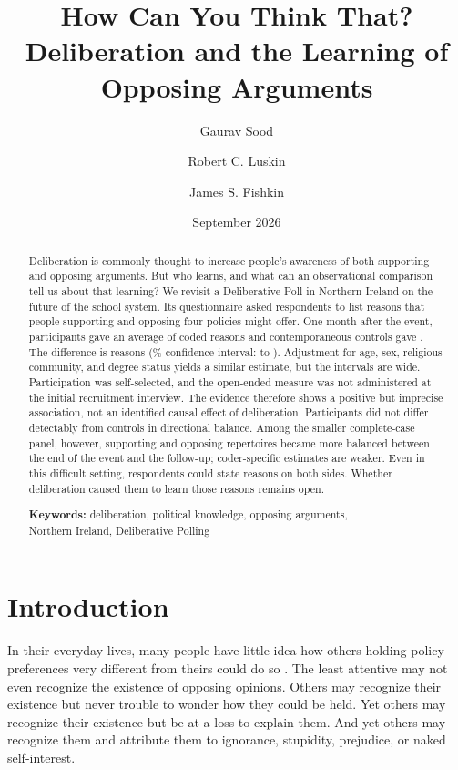 \documentclass{article}
\title{How Can You Think That?\\Deliberation and the Learning of Opposing Arguments}
\author{Gaurav Sood \and Robert C. Luskin \and James S. Fishkin}
\date{September 2026}
\begin{document}
\maketitle

\begin{abstract}
Deliberation is commonly thought to increase people's awareness of both supporting and
opposing arguments. But who learns, and what can an observational comparison tell us about
that learning? We revisit a Deliberative Poll in Northern Ireland on the future of the school
system. Its questionnaire asked respondents to list reasons that people supporting and opposing
four policies might offer. One month after the event, participants gave an average of
\ParticipantTthreeMean{} coded reasons and contemporaneous controls gave \ControlMean{}.
The difference is \MainDifference{} reasons (\ConfidenceLevel\% confidence interval: \MainLow{} to
\MainHigh{}). Adjustment for age, sex, religious community, and degree status yields a similar
estimate, but the intervals are wide. Participation was self-selected, and the open-ended
measure was not administered at the initial recruitment interview. The evidence therefore
shows a positive but imprecise association, not an identified causal effect of deliberation.
Participants did not differ detectably from controls in directional balance. Among the smaller
complete-case panel, however, supporting and opposing repertoires became more balanced between
the end of the event and the follow-up; coder-specific estimates are weaker. Even in this
difficult setting, respondents could state reasons on both sides. Whether deliberation caused
them to learn those reasons remains open.

\medskip
\noindent\textbf{Keywords:} deliberation, political knowledge, opposing arguments,
\\Northern Ireland, Deliberative Polling
\end{abstract}

\newpage
\section{Introduction}

In their everyday lives, many people have little idea how others holding policy preferences
very different from theirs could do so \citep{mutz2002cross}. The least attentive may not even
recognize the existence of opposing opinions. Others may recognize their existence but never
trouble to wonder how they could be held. Yet others may recognize their existence but be at a
loss to explain them. And yet others may recognize them and attribute them to ignorance,
stupidity, prejudice, or naked self-interest.
\end{document}
